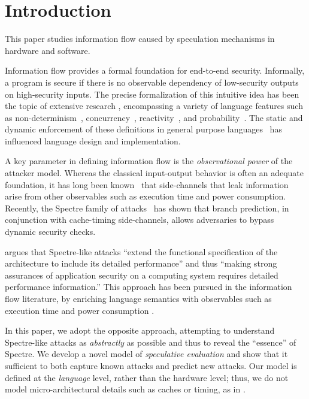 \section{Introduction}

This paper studies information flow caused by speculation mechanisms
in hardware and software.

Information flow provides a formal
foundation for end-to-end security.  Informally, a program is secure
if there is no observable dependency of low-security outputs on high-security inputs.
The precise formalization of this intuitive idea has been the topic of
extensive research \cite{Sabelfeld:2006:LIS:2312191.2314769}, encompassing a variety of language
features such as non-determinism~\cite{Wittbold1990InformationFI},
concurrency~\cite{Smith:1998:SIF:268946.268975}, reactivity~\cite{O'Neill:2006:ISI:1155442.1155677}, and
probability~\cite{Gray:1992:TMF:2699806.2699811}. The static and dynamic enforcement
of these definitions in general purpose languages~\cite{myers-popl99} has %
influenced language design and implementation.

A key parameter in defining information flow is the \emph{observational power} of the attacker model. Whereas the classical
input-output behavior is often an adequate foundation,
it has long been known~\cite{Lampson:1973:NCP:362375.362389,Biswas:2017:STC:3058791.3023872} that side-channels that leak
information arise from other observables such as execution time and
power consumption.
Recently, the Spectre family of attacks~\cite{DBLP:journals/corr/abs-1801-01203} has
shown that branch prediction, in conjunction with cache-timing side-channels,
allows adversaries to bypass dynamic security checks.

\citet{Chien:2018} argues that Spectre-like attacks ``extend the functional
specification of the architecture to include its detailed performance'' and
thus ``making strong assurances of application security on a computing system
requires detailed performance information.''
This approach has been pursued in the information flow literature, by
enriching language semantics with observables such as execution time and  power consumption
\cite{Zhang:2012:LCM:2345156.2254078,hyperflow}.

In this paper, we adopt the opposite approach, attempting to understand
Spectre-like attacks as \emph{abstractly} as possible and thus to reveal the
``essence'' of Spectre.  We develop a novel model of \emph{speculative
  evaluation} and show that it sufficient to both capture known attacks and
predict new attacks.  Our model is defined at the \emph{language} level,
rather than the hardware level; thus, we do not model micro-architectural
details such as caches or timing, as in
\cite{Zhang:2012:LCM:2345156.2254078,hyperflow}.


